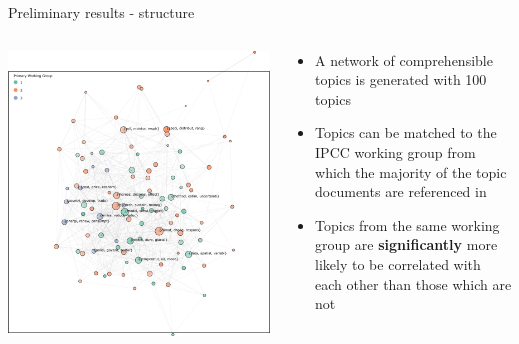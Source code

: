 \documentclass[9pt]{beamer}
\begin{document}
\begin{frame}{Preliminary results - structure}

\begin{columns}
	\begin{column}{0.6\linewidth}
		\begin{center}
			\includegraphics[width=0.85\linewidth]{../plots/network_wg_372.PNG}
		\end{center}
	\end{column}
	\begin{column}{0.4\linewidth}
		\begin{center}
			\begin{itemize}
				\item A network of comprehensible topics is generated with 100 topics
				\item Topics can be matched to the IPCC working group from which the majority of the topic documents are referenced in
				\item Topics from the same working group are \textbf{significantly} more likely to be correlated with each other than those which are not
			\end{itemize}
		\end{center}
	\end{column}
\end{columns}

\end{frame}
\end{document}
